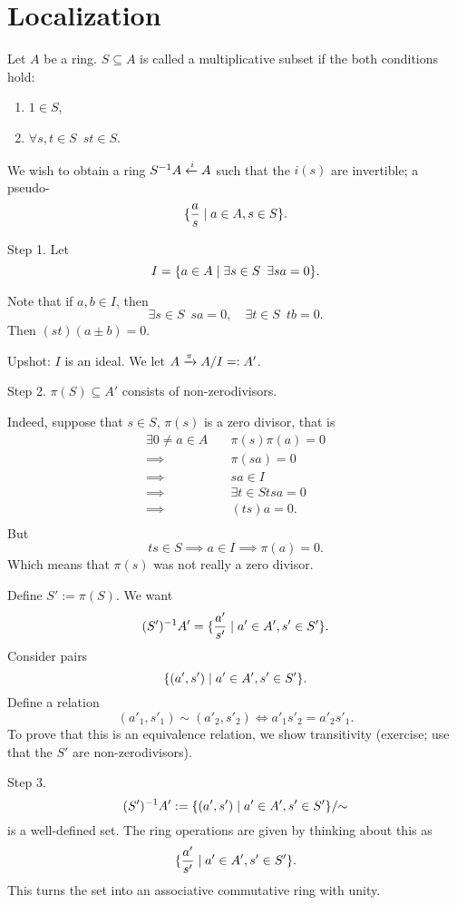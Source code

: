 \section{Localization}
\begin{df}
Let $A$ be a ring. $S \subseteq A$ is called a multiplicative subset if the both conditions hold:
\begin{enumerate}
\item $1 \in S$,
\item $\forall s, t \in S \enspace st \in S$.
\end{enumerate}
\end{df}


We wish to obtain a ring $S^{-1}A \xleftarrow{i} A$ such that the $i(s)$ are invertible; a pseudo-
\[ \{\frac{a}{s} \mathrel{|} a \in A, s \in S \}.\]

\begin{construction}
  \mbox{}
  
  Step 1.
Let
\[I = \{ a \in A \mathrel{|} \exists s \in S \enspace \exists sa = 0 \}.\]

Note that if $a, b \in I$, then
\[ \exists s \in S \enspace sa = 0, \quad \exists t \in S \enspace tb = 0.\]
Then $(st)(a \pm b) = 0$.

Upshot: $I$ is an ideal.
We let
$A \xrightarrow{\pi} A/I =: A'$.

Step 2.
$\pi(S) \subseteq A'$
consists of non-zerodivisors.

Indeed, suppose that $s \in S$, $\pi(s)$ is a zero divisor, that is
\begin{align*}
\exists 0 \neq a \in A \quad & \pi(s) \pi(a) = 0 \\
\implies & \pi(sa) = 0 \\
\implies & sa \in I \\
\implies & \exists t \in S tsa = 0 \\
\implies & (ts)a = 0.\\
\end{align*}
But
\[ ts \in S \implies a \in I \implies \pi(a) = 0.\]
Which means that $\pi(s)$ was not really a zero divisor.

Define $S' := \pi(S)$. We want
\[ (S')^{-1} A' = \{ \frac{a'}{s'} \mathrel{|} a' \in A', s' \in S' \}.\]
Consider pairs
\[\{(a', s') \mathrel{|} a' \in A', s' \in S'\}.\]
Define a relation
\[(a'_1, s'_1) \sim (a'_2, s'_2) \iff a'_1 s'_2 = a'_2 s'_1.\]
To prove that this is an equivalence relation, we show transitivity (exercise; use that the $S'$ are non-zerodivisors).

Step 3.
\[(S')^{-1}A' := \{(a', s') \mathrel{|} a' \in A', s' \in S' \} / {\sim}\]
is a well-defined set.
The ring operations are given by thinking about this as
\[ \{ \frac{a'}{s'} \mathrel{|} a' \in A', s' \in S'\}.\]
This turns the set into an associative commutative ring with unity.
\end{construction}

